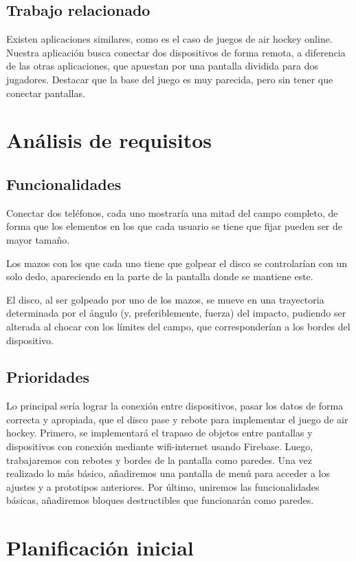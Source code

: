 \documentclass[a4paper,openright,12pt]{article}
\begin{document}
\subsection{Trabajo relacionado}
Existen aplicaciones similares, como es el caso de juegos de air hockey online. Nuestra aplicación busca conectar dos dispositivos de forma remota, a diferencia de las otras aplicaciones, que apuestan por una pantalla dividida para dos jugadores. Destacar que la base del juego es muy parecida, pero sin tener que conectar pantallas.

\section{Análisis de requisitos}

\subsection{Funcionalidades}
Conectar dos teléfonos, cada uno mostraría una mitad del campo completo, de forma que los elementos en los que cada usuario se tiene que fijar pueden ser de mayor tamaño.
 
Los mazos con los que cada uno tiene que golpear el disco se controlarían con un solo dedo, apareciendo en la parte de la pantalla donde se mantiene este.
 
El disco, al ser golpeado por uno de los mazos, se mueve en una trayectoria determinada por el ángulo (y, preferiblemente, fuerza) del impacto, pudiendo ser alterada al chocar con los límites del campo, que corresponderían a los bordes del dispositivo.
\subsection{Prioridades}
Lo principal sería lograr la conexión entre dispositivos, pasar los datos de forma correcta y apropiada, que el disco pase y rebote para implementar el juego de air hockey.
Primero, se implementará el trapaso de objetos entre pantallas y dispositivos con conexión mediante wifi-internet usando Firebase.
Luego, trabajaremos con rebotes y bordes de la pantalla como paredes.
Una vez realizado lo más básico, añadiremos una pantalla de menú para acceder a los ajustes y a prototipos anteriores. 
Por último, uniremos las funcionalidades básicas, añadiremos bloques destructibles que funcionarán como paredes.

\section{Planificación inicial}
\end{document}
